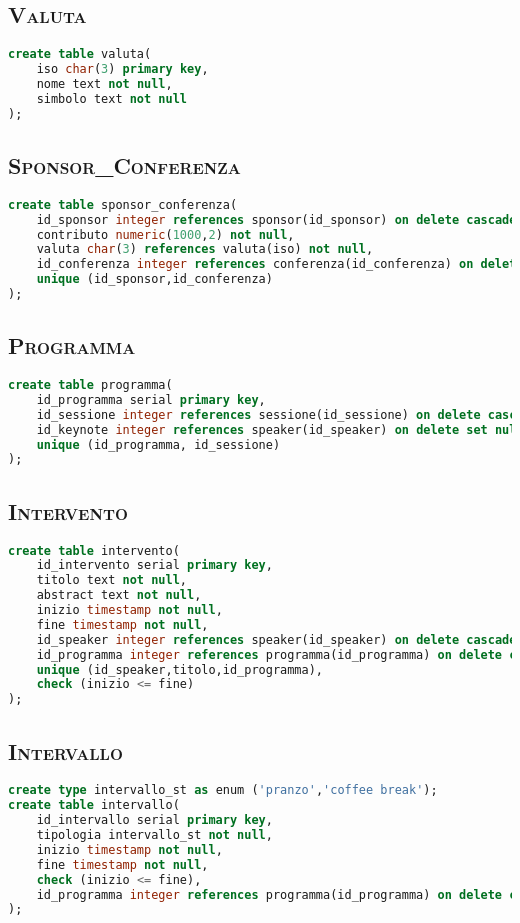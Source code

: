 \subsection{\textsc{Valuta}}
\begin{lstlisting}[language=SQL,style=mystyle,caption={Tabella: Valuta}]
create table valuta(
    iso char(3) primary key,
    nome text not null,
    simbolo text not null
);
\end{lstlisting}
\subsection{\textsc{Sponsor\_Conferenza}}
\begin{lstlisting}[language=SQL,style=mystyle, caption={Tabella: Sponsor\_Conferenza}]
create table sponsor_conferenza(
    id_sponsor integer references sponsor(id_sponsor) on delete cascade not null,
    contributo numeric(1000,2) not null,
    valuta char(3) references valuta(iso) not null,
    id_conferenza integer references conferenza(id_conferenza) on delete cascade not null,
    unique (id_sponsor,id_conferenza) 
);
\end{lstlisting}
\subsection{\textsc{Programma}}
\begin{lstlisting}[language=SQL,style=mystyle,caption={Tabella: Programma}]
create table programma(
    id_programma serial primary key,
    id_sessione integer references sessione(id_sessione) on delete cascade not null,
    id_keynote integer references speaker(id_speaker) on delete set null,
    unique (id_programma, id_sessione)
);
\end{lstlisting}
\subsection{\textsc{Intervento}}
\begin{lstlisting}[language=SQL,style=mystyle, caption={Tabella: Intervento}]
create table intervento(
    id_intervento serial primary key,
    titolo text not null,
    abstract text not null,
    inizio timestamp not null,
    fine timestamp not null,
    id_speaker integer references speaker(id_speaker) on delete cascade,
    id_programma integer references programma(id_programma) on delete cascade not null,
    unique (id_speaker,titolo,id_programma), 
    check (inizio <= fine) 
);
\end{lstlisting}
\subsection{\textsc{Intervallo}}
\begin{lstlisting}[language=SQL,style=mystyle, caption={Tabella: Programma}]
create type intervallo_st as enum ('pranzo','coffee break');
create table intervallo(
    id_intervallo serial primary key,
    tipologia intervallo_st not null,
    inizio timestamp not null,
    fine timestamp not null,
    check (inizio <= fine), 
    id_programma integer references programma(id_programma) on delete cascade not null
);
\end{lstlisting}
